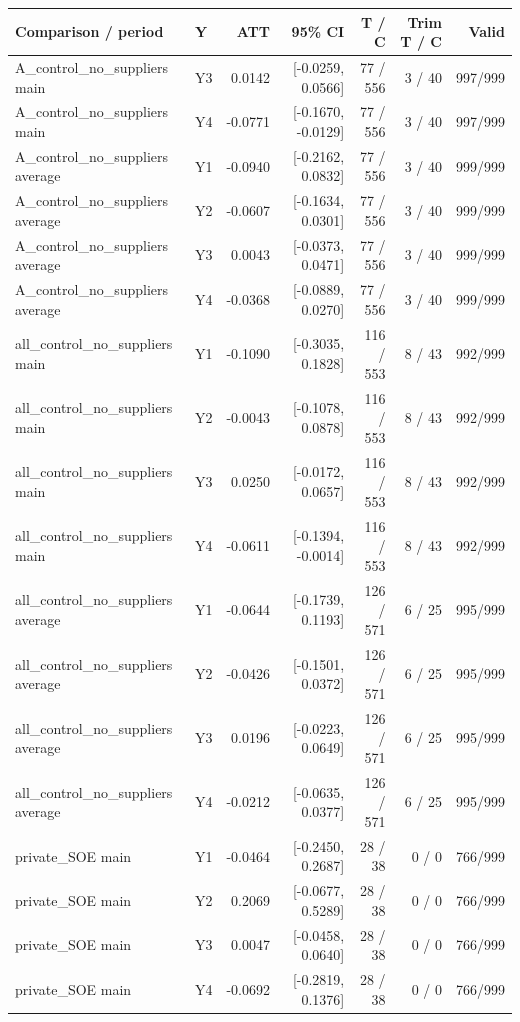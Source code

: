 \par\medskip
\begin{tabular}{llrrrrr}
\toprule
Comparison / period & Y & ATT & 95\% CI & T / C & Trim T / C & Valid \\
\midrule
A\_control\_no\_suppliers main & Y3 & 0.0142 & [-0.0259, 0.0566] & 77 / 556 & 3 / 40 & 997/999 \\
A\_control\_no\_suppliers main & Y4 & -0.0771 & [-0.1670, -0.0129] & 77 / 556 & 3 / 40 & 997/999 \\
A\_control\_no\_suppliers average & Y1 & -0.0940 & [-0.2162, 0.0832] & 77 / 556 & 3 / 40 & 999/999 \\
A\_control\_no\_suppliers average & Y2 & -0.0607 & [-0.1634, 0.0301] & 77 / 556 & 3 / 40 & 999/999 \\
A\_control\_no\_suppliers average & Y3 & 0.0043 & [-0.0373, 0.0471] & 77 / 556 & 3 / 40 & 999/999 \\
A\_control\_no\_suppliers average & Y4 & -0.0368 & [-0.0889, 0.0270] & 77 / 556 & 3 / 40 & 999/999 \\
all\_control\_no\_suppliers main & Y1 & -0.1090 & [-0.3035, 0.1828] & 116 / 553 & 8 / 43 & 992/999 \\
all\_control\_no\_suppliers main & Y2 & -0.0043 & [-0.1078, 0.0878] & 116 / 553 & 8 / 43 & 992/999 \\
all\_control\_no\_suppliers main & Y3 & 0.0250 & [-0.0172, 0.0657] & 116 / 553 & 8 / 43 & 992/999 \\
all\_control\_no\_suppliers main & Y4 & -0.0611 & [-0.1394, -0.0014] & 116 / 553 & 8 / 43 & 992/999 \\
all\_control\_no\_suppliers average & Y1 & -0.0644 & [-0.1739, 0.1193] & 126 / 571 & 6 / 25 & 995/999 \\
all\_control\_no\_suppliers average & Y2 & -0.0426 & [-0.1501, 0.0372] & 126 / 571 & 6 / 25 & 995/999 \\
all\_control\_no\_suppliers average & Y3 & 0.0196 & [-0.0223, 0.0649] & 126 / 571 & 6 / 25 & 995/999 \\
all\_control\_no\_suppliers average & Y4 & -0.0212 & [-0.0635, 0.0377] & 126 / 571 & 6 / 25 & 995/999 \\
private\_SOE main & Y1 & -0.0464 & [-0.2450, 0.2687] & 28 / 38 & 0 / 0 & 766/999 \\
private\_SOE main & Y2 & 0.2069 & [-0.0677, 0.5289] & 28 / 38 & 0 / 0 & 766/999 \\
private\_SOE main & Y3 & 0.0047 & [-0.0458, 0.0640] & 28 / 38 & 0 / 0 & 766/999 \\
private\_SOE main & Y4 & -0.0692 & [-0.2819, 0.1376] & 28 / 38 & 0 / 0 & 766/999 \\
\bottomrule
\end{tabular}

